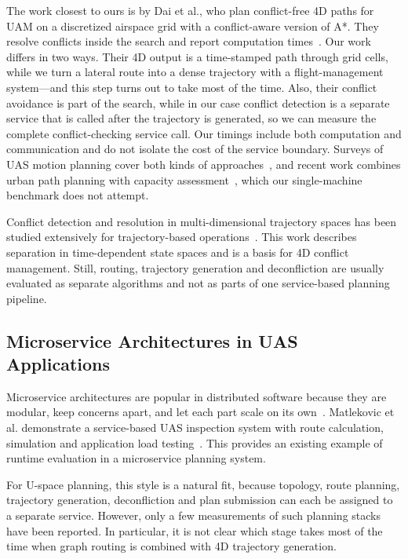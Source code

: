 The work closest to ours is by Dai et al., who plan conflict-free 4D paths for UAM on a discretized airspace grid with a conflict-aware version of A*. They resolve conflicts inside the search and report computation times~\cite{dai2021_conflict_free_4d_uam}. Our work differs in two ways. Their 4D output is a time-stamped path through grid cells, while we turn a lateral route into a dense trajectory with a flight-management system---and this step turns out to take most of the time. Also, their conflict avoidance is part of the search, while in our case conflict detection is a separate service that is called after the trajectory is generated, so we can measure the complete conflict-checking service call. Our timings include both computation and communication and do not isolate the cost of the service boundary. Surveys of UAS motion planning cover both kinds of approaches~\cite{ahmad2023_uav_path_planning_survey,zhou2025_uav_motion_planning_survey}, and recent work combines urban path planning with capacity assessment~\cite{feng2025_low_altitude_capacity}, which our single-machine benchmark does not attempt.

Conflict detection and resolution in multi-dimensional trajectory spaces has been studied extensively for trajectory-based operations~\cite{NDMap,enea_porretta_4d_tbo_comparison}. This work describes separation in time-dependent state spaces and is a basis for 4D conflict management. Still, routing, trajectory generation and deconfliction are usually evaluated as separate algorithms and not as parts of one service-based planning pipeline.

\subsection{Microservice Architectures in UAS Applications}

Microservice architectures are popular in distributed software because they are modular, keep concerns apart, and let each part scale on its own~\cite{dragoni2017microservices}. Matlekovic et al. demonstrate a service-based UAS inspection system with route calculation, simulation and application load testing~\cite{matlekovic2020uav}. This provides an existing example of runtime evaluation in a microservice planning system.

For U-space planning, this style is a natural fit, because topology, route planning, trajectory generation, deconfliction and plan submission can each be assigned to a separate service. However, only a few measurements of such planning stacks have been reported. In particular, it is not clear which stage takes most of the time when graph routing is combined with 4D trajectory generation.

